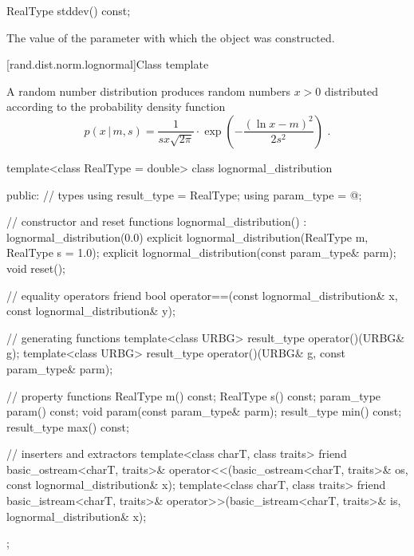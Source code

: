 %
\begin{itemdecl}
RealType stddev() const;
\end{itemdecl}

\begin{itemdescr}
\pnum
\returns
The value of the  parameter
 with which the object was constructed.
\end{itemdescr}


[rand.dist.norm.lognormal]{Class template }%
%

\pnum
A  random number distribution
produces random numbers $x > 0$
distributed according to
the probability density function%
\[ p(x\,|\,m,s) = \frac{1}{s x \sqrt{2 \pi}}
     \cdot \exp{\left(-\frac{(\ln{x} - m)^2}{2 s^2}\right)}
     \text{ .} \]

%
%
\begin{codeblock}
template<class RealType = double>
  class lognormal_distribution {
  public:
    // types
    using result_type = RealType;
    using param_type  = @\unspec@;

    // constructor and reset functions
    lognormal_distribution() : lognormal_distribution(0.0) {}
    explicit lognormal_distribution(RealType m, RealType s = 1.0);
    explicit lognormal_distribution(const param_type& parm);
    void reset();

    // equality operators
    friend bool operator==(const lognormal_distribution& x, const lognormal_distribution& y);

    // generating functions
    template<class URBG>
      result_type operator()(URBG& g);
    template<class URBG>
      result_type operator()(URBG& g, const param_type& parm);

    // property functions
    RealType m() const;
    RealType s() const;
    param_type param() const;
    void param(const param_type& parm);
    result_type min() const;
    result_type max() const;

    // inserters and extractors
    template<class charT, class traits>
      friend basic_ostream<charT, traits>&
        operator<<(basic_ostream<charT, traits>& os, const lognormal_distribution& x);
    template<class charT, class traits>
      friend basic_istream<charT, traits>&
        operator>>(basic_istream<charT, traits>& is, lognormal_distribution& x);
  };
\end{codeblock}


